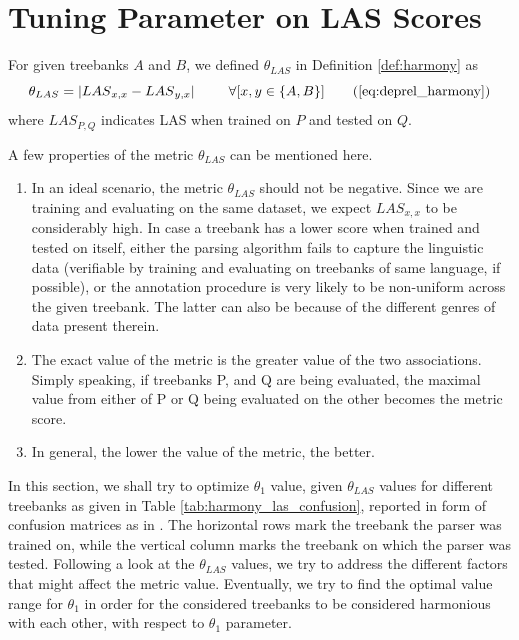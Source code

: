 \section{Tuning Parameter on LAS Scores}

For given treebanks \(A\) and \(B\), we defined \(\theta_{LAS}\) in Definition \ref{def:harmony} as
\begin{equation*}
        \theta_{LAS} = \vert {LAS}_{x,x} - {LAS}_{y,x} \vert \hspace{5mm} \quad \forall [x, y \in \{A,B\}] \tag{\ref{eq:deprel_harmony}}
\end{equation*}
where \(LAS_{P,Q}\) indicates LAS when trained on \(P\) and tested on \(Q\).

A few properties of the metric \(\theta_{LAS}\) can be mentioned here.
\begin{enumerate}
    \item In an ideal scenario, the metric \(\theta_{LAS}\) should not be negative. Since we are training and evaluating on the same dataset, we expect \({LAS}_{x,x}\) to be considerably high. In case a treebank has a lower score when trained and tested on itself, either the parsing algorithm fails to capture the linguistic data (verifiable by training and evaluating on treebanks of same language, if possible), or the annotation procedure is very likely to be non-uniform across the given treebank. The latter can also be because of the different genres of data present therein.
    \item The exact value of the metric is the greater value of the two associations. Simply speaking, if treebanks P, and Q are being evaluated, the maximal value from either of P or Q being evaluated on the other becomes the metric score.
    \item In general, the lower the value of the metric, the better.
\end{enumerate}
    
In this section, we shall try to optimize \(\theta_1\) value, given \(\theta_{LAS}\) values for different treebanks as given in Table \ref{tab:harmony_las_confusion}, reported in form of confusion matrices as in \cite{alonso2016universal}. The horizontal rows mark the treebank the parser was trained on, while the vertical column marks the treebank on which the parser was tested. Following a look at the \(\theta_{LAS}\) values, we try to address the different factors that might affect the metric value. Eventually, we try to find the optimal value range for \(\theta_1\) in order for the considered treebanks to be considered harmonious with each other, with respect to \(\theta_1\) parameter.

